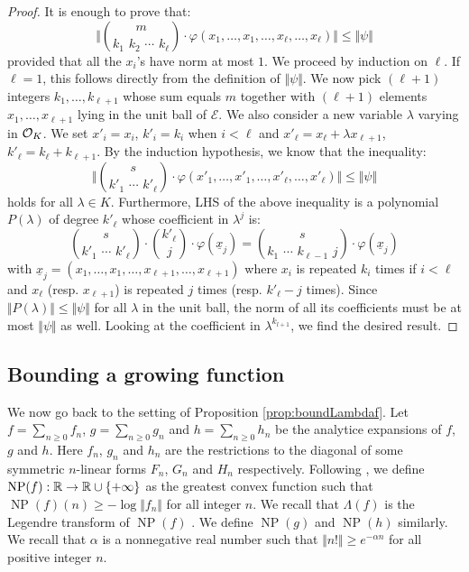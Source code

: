 \documentclass{sig-alternate}
\DeclareMathOperator{\NP}{NP}
\begin{document}
\begin{proof}
It is enough to prove that:
$$\Big\Vert \binom m {k_1 \,\, k_2 \,\, \cdots \,\, k_\ell} \cdot
\varphi(x_1, \ldots, x_1, \ldots, x_\ell, \ldots,
x_\ell) \Big\Vert \leq \Vert \psi \Vert$$
provided that all the $x_i$'s have norm at most $1$. We proceed by 
induction on 
$\ell$. If $\ell = 1$, this follows directly from
the definition of $\Vert \psi \Vert$. 
We now pick $(\ell+1)$ integers $k_1, \ldots, k_{\ell+1}$ whose sum 
equals $m$ together with $(\ell+1)$ elements $x_1, \ldots, x_{\ell+1}$
lying in the unit ball of $\mathcal E$.
We also consider a new variable $\lambda$ varying in
$\mathcal O_K$. We set $x'_i = x_i$, $k'_i = k_i$ when $i < \ell$ and $x'_\ell 
= x_\ell + \lambda x_{\ell+1}$, $k'_\ell = k_\ell + k_{\ell+1}$. By the 
induction hypothesis, we know that the inequality:
$$\Big\Vert \binom s {k'_1 \,\, \cdots \,\, k'_\ell} \cdot
\varphi(x'_1, \ldots, x'_1, \ldots, x'_\ell, \ldots, x'_\ell) \Big\Vert
\leq \Vert \psi \Vert$$
holds for all $\lambda \in K$. Furthermore, LHS of the above inequality
is a polynomial $P(\lambda)$ of degree $k'_\ell$ whose coefficient in 
$\lambda^j$ is:
$$\binom s {k'_1 \,\, \cdots \,\, k'_\ell} \cdot
\binom {k'_\ell} {j} \cdot
\varphi(\underline x_j) = 
\binom s {k_1 \,\, \cdots \,\, k_{\ell-1} \,\, j} \cdot
\varphi(\underline x_j)$$
with
$\underline x_j = (x_1, \ldots, x_1, \ldots, x_{\ell+1}, \ldots, 
x_{\ell+1})$
where $x_i$ is repeated $k_i$ times if $i < \ell$ and $x_\ell$ 
(resp. $x_{\ell+1}$) is repeated $j$ times (resp. $k'_\ell - j$ times).
Since $\Vert P(\lambda) \Vert \leq \Vert \psi \Vert$ for all $\lambda$ in 
the unit ball, the norm of all its coefficients must be at most $\Vert \psi
\Vert$ as well. Looking at the coefficient in $\lambda^{k_{l+1}}$, we find
the desired result.
\end{proof}

\subsection{Bounding a growing function}

We now go back to the setting of Proposition \ref{prop:boundLambdaf}.
Let $f = \sum_{n \geq 0} f_n$, $g = \sum_{n \geq 0} g_n$ and
$h = \sum_{n \geq 0} h_n$ be the analytice expansions of
$f$, $g$ and $h$.
Here $f_n$, $g_n$ and $h_n$ are the restrictions to the diagonal of 
some symmetric $n$-linear forms $F_n$, $G_n$ and $H_n$ respectively.
Following \cite{caruso-roe-vaccon:14a}, we define $\NP(f) : \R \to \R \cup 
\{+\infty\}$ as the greatest convex function such that $\NP(f)(n) \geq - 
\log \Vert f_n \Vert$ for all integer $n$. We recall that $\Lambda(f)$ 
is the Legendre transform of $\NP(f)$ 
\cite[Proposition 3.9]{caruso-roe-vaccon:14a}.
We define $\NP(g)$ and $\NP(h)$ similarly.
We recall that $\alpha$ is a nonnegative real number such that $\Vert n! 
\Vert \geq e^{-\alpha n}$ for all positive integer $n$.
\end{document}
